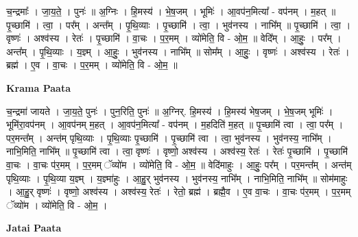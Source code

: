 \documentclass[17pt]{extarticle}
\begin{document}
च॒न्द्रमाः᳚ । जा॒य॒ते॒ । पुनः॑ ॥ अ॒ग्निः । हि॒मस्य॑ । भे॒ष॒जम् । भूमिः॑ । आ॒वप॑न॒मित्या᳚ - वप॑नम् । म॒हत् ॥ पृ॒च्छामि॑ । त्वा॒ । पर᳚म् । अन्त᳚म् । पृ॒थि॒व्याः । पृ॒च्छामि॑ । त्वा॒ । भुव॑नस्य । नाभि᳚म् ॥ पृ॒च्छामि॑ । त्वा॒ । वृष्णः॑ । अश्व॑स्य । रेतः॑ । पृ॒च्छामि॑ । वा॒चः । प॒र॒मम् । व्यो॑मेति॒ वि - ओ॒म॒ ॥ वेदि᳚म् । आ॒हुः॒ । पर᳚म् । अन्त᳚म् । पृ॒थि॒व्याः । य॒ज्ञ्म् । आ॒हुः॒ । भुव॑नस्य । नाभि᳚म् ॥ सोम᳚म् । आ॒हुः॒ । वृष्णः॑ । अश्व॑स्य । रेतः॑ । ब्रह्म॑ । ए॒व । वा॒चः । प॒र॒मम् । व्यो॑मेति॒ वि - ओ॒म॒ ॥  \newline


\textbf{Krama Paata} \newline

च॒न्द्रमा॑ जायते । जा॒य॒ते॒ पुनः॑ । पुन॒रिति॒ पुनः॑ ॥ अ॒ग्निर्. हि॒मस्य॑ । हि॒मस्य॑ भेष॒जम् । भे॒ष॒जम् भूमिः॑ । भूमि॑रा॒वप॑नम् । आ॒वप॑नम् म॒हत् । आ॒वप॑न॒मित्या᳚ - वप॑नम् । म॒हदिति॑ म॒हत् ॥ पृ॒च्छामि॑ त्वा । त्वा॒ पर᳚म् । पर॒मन्त᳚म् । अन्त॑म् पृथि॒व्याः । पृ॒थि॒व्याः पृ॒च्छामि॑ । पृ॒च्छामि॑ त्वा । त्वा॒ भुव॑नस्य । भुव॑नस्य॒ नाभि᳚म् । नाभि॒मिति॒ नाभि᳚म् ॥ पृ॒च्छामि॑ त्वा । त्वा॒ वृष्णः॑ । वृष्णो॒ अश्व॑स्य । अश्व॑स्य॒ रेतः॑ । रेतः॑ पृ॒च्छामि॑ । पृ॒च्छामि॑ वा॒चः । वा॒चः प॑र॒मम् । प॒र॒मम् ॅव्यो॑म । व्यो॑मेति॒ वि - ओ॒म॒ ॥ वेदि॑माहुः । आ॒हुः॒ पर᳚म् । पर॒मन्त᳚म् । अन्त॑म् पृथि॒व्याः । पृ॒थि॒व्या य॒ज्ञ्म् । य॒ज्ञ्मा॑हुः । आ॒हु॒र् भुव॑नस्य । भुव॑नस्य॒ नाभि᳚म् । नाभि॒मिति॒ नाभि᳚म् ॥ सोम॑माहुः । आ॒हु॒र् वृष्णः॑ । वृष्णो॒ अश्व॑स्य । अश्व॑स्य॒ रेतः॑ । रेतो॒ ब्रह्म॑ । ब्रह्मै॒व । ए॒व वा॒चः । वा॒चः प॑र॒मम् । प॒र॒मम् ॅव्यो॑म । व्यो॑मेति॒ वि - ओ॒म॒ । \newline

\textbf{Jatai Paata} \newline
\end{document}
